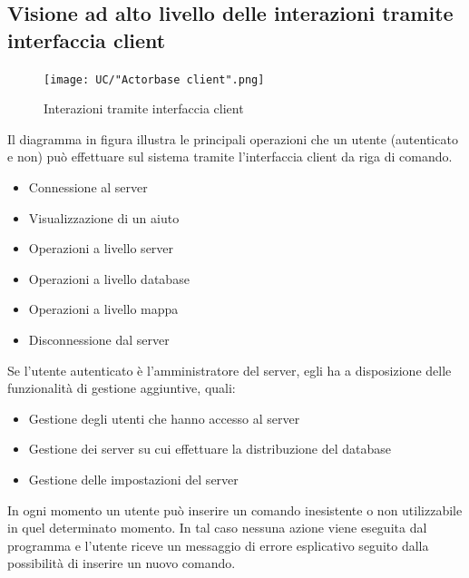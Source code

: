 \documentclass[a4paper]{article}
\begin{document}
		\subsection{Visione ad alto livello delle interazioni tramite interfaccia client}
		 	\begin{figure}[H]
				\centering
				\texttt{[image: UC/"Actorbase client".png]}
				\caption{Interazioni tramite interfaccia client}
			\end{figure}
			Il diagramma in figura illustra le principali operazioni che un utente (autenticato e non) può
			 effettuare sul sistema tramite l'interfaccia client da riga di comando. 
			\begin{itemize}
				\item Connessione al server
				\item Visualizzazione di un aiuto
				\item Operazioni a livello server
				\item Operazioni a livello database
				\item Operazioni a livello mappa
				\item Disconnessione dal server
			\end{itemize}
			Se l'utente autenticato è l'amministratore del server, egli ha a disposizione delle funzionalità di gestione aggiuntive, quali:
			\begin{itemize}
			\item Gestione degli utenti che hanno accesso al server
			\item Gestione dei server su cui effettuare la distribuzione del database
			\item Gestione delle impostazioni del server
			\end{itemize}
	In ogni momento un utente può inserire un comando inesistente o non utilizzabile in quel determinato momento. In tal caso nessuna azione viene eseguita dal programma e l'utente riceve un messaggio di errore esplicativo seguito dalla possibilità di inserire un nuovo comando.	 
	 
	 
	 
\end{document}
